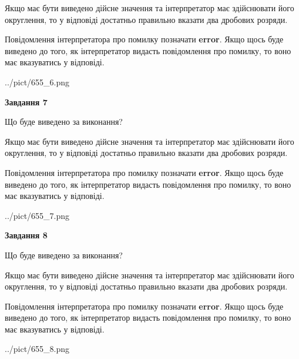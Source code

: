 \documentclass[12pt, ukrainian]{article}
\begin{document}
{\begin {Large}
Якщо має бути виведено дійсне значення та інтерпретатор має здійснювати його округлення, 
то у відповіді достатньо правильно вказати два дробових розряди.

Повідомлення інтерпретатора про помилку позначати \textbf{error}.
Якщо щось буде виведено до того, як інтерпретатор видасть повідомлення про помилку, 
то воно має вказуватись у відповіді. \par

\begin{center}
	{../pict/655_6.png}
\end{center}
\newpage

{\begin {center}\textbf{Завдання 7}\end {center}}\par
Що буде виведено за виконання? \par

Якщо має бути виведено дійсне значення та інтерпретатор має здійснювати його округлення, 
то у відповіді достатньо правильно вказати два дробових розряди.

Повідомлення інтерпретатора про помилку позначати \textbf{error}.
Якщо щось буде виведено до того, як інтерпретатор видасть повідомлення про помилку, 
то воно має вказуватись у відповіді. \par

\begin{center}
	{../pict/655_7.png}
\end{center}
\newpage

{\begin {center}\textbf{Завдання 8}\end {center}}\par
Що буде виведено за виконання? \par

Якщо має бути виведено дійсне значення та інтерпретатор має здійснювати його округлення, 
то у відповіді достатньо правильно вказати два дробових розряди.

Повідомлення інтерпретатора про помилку позначати \textbf{error}.
Якщо щось буде виведено до того, як інтерпретатор видасть повідомлення про помилку, 
то воно має вказуватись у відповіді. \par

\begin{center}
	{../pict/655_8.png}
\end{center}
\newpage


\end{Large}}
\end{document}

